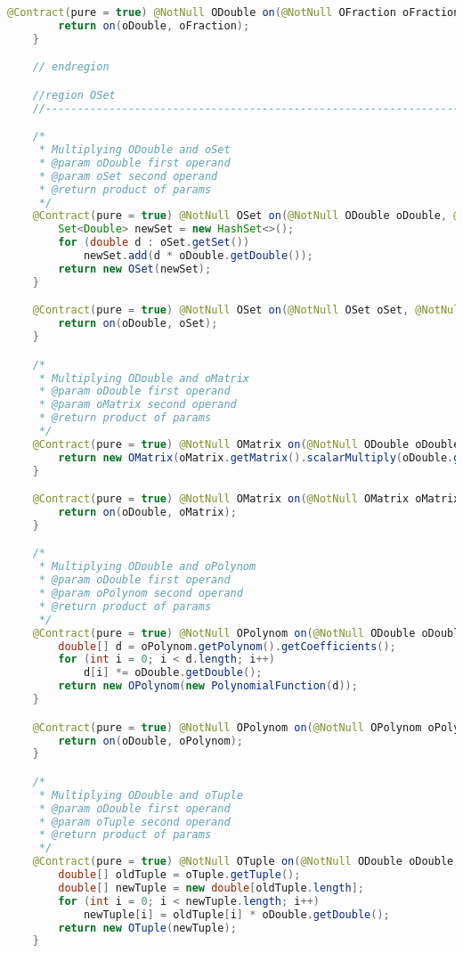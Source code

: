 \begin{lstlisting}[caption=Times (Schwenke),label=list:Times,language=Java]
    @Contract(pure = true) @NotNull ODouble on(@NotNull OFraction oFraction, @NotNull ODouble oDouble) {
        return on(oDouble, oFraction);
    }

    // endregion

    //region OSet
    //------------------------------------------------------------------------------------

    /*
     * Multiplying ODouble and oSet
     * @param oDouble first operand
     * @param oSet second operand
     * @return product of params
     */
    @Contract(pure = true) @NotNull OSet on(@NotNull ODouble oDouble, @NotNull OSet oSet) {
        Set<Double> newSet = new HashSet<>();
        for (double d : oSet.getSet())
            newSet.add(d * oDouble.getDouble());
        return new OSet(newSet);
    }

    @Contract(pure = true) @NotNull OSet on(@NotNull OSet oSet, @NotNull ODouble oDouble) {
        return on(oDouble, oSet);
    }

    /*
     * Multiplying ODouble and oMatrix
     * @param oDouble first operand
     * @param oMatrix second operand
     * @return product of params
     */
    @Contract(pure = true) @NotNull OMatrix on(@NotNull ODouble oDouble, @NotNull OMatrix oMatrix) {
        return new OMatrix(oMatrix.getMatrix().scalarMultiply(oDouble.getDouble()));
    }

    @Contract(pure = true) @NotNull OMatrix on(@NotNull OMatrix oMatrix, @NotNull ODouble oDouble) {
        return on(oDouble, oMatrix);
    }

    /*
     * Multiplying ODouble and oPolynom
     * @param oDouble first operand
     * @param oPolynom second operand
     * @return product of params
     */
    @Contract(pure = true) @NotNull OPolynom on(@NotNull ODouble oDouble, @NotNull OPolynom oPolynom) {
        double[] d = oPolynom.getPolynom().getCoefficients();
        for (int i = 0; i < d.length; i++)
            d[i] *= oDouble.getDouble();
        return new OPolynom(new PolynomialFunction(d));
    }

    @Contract(pure = true) @NotNull OPolynom on(@NotNull OPolynom oPolynom, @NotNull ODouble oDouble) {
        return on(oDouble, oPolynom);
    }

    /*
     * Multiplying ODouble and oTuple
     * @param oDouble first operand
     * @param oTuple second operand
     * @return product of params
     */
    @Contract(pure = true) @NotNull OTuple on(@NotNull ODouble oDouble, @NotNull OTuple oTuple) {
        double[] oldTuple = oTuple.getTuple();
        double[] newTuple = new double[oldTuple.length];
        for (int i = 0; i < newTuple.length; i++)
            newTuple[i] = oldTuple[i] * oDouble.getDouble();
        return new OTuple(newTuple);
    }


\end{lstlisting}
